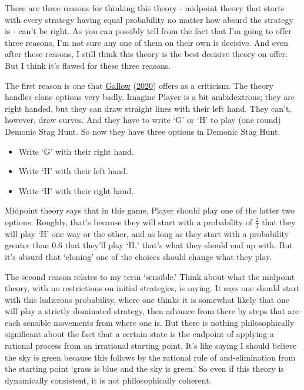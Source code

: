 \documentclass[
  12pt,
]{article}
\providecommand{\tightlist}{%
  \setlength{\itemsep}{0pt}\setlength{\parskip}{0pt}}
\begin{document}
There are three reasons for thinking this theory - midpoint theory that
starts with every strategy having equal probability no matter how absurd
the strategy is - can't be right. As you can possibly tell from the fact
that I'm going to offer three reasons, I'm not sure any one of them on
their own is decisive. And even after these reasons, I still think this
theory is the best decisive theory on offer. But I think it's flawed for
these three reasons.

The first reason is one that \protect\hyperlink{ref-Gallow2020}{Gallow}
(\protect\hyperlink{ref-Gallow2020}{2020}) offers as a criticism. The
theory handles clone options very badly. Imagine Player is a bit
ambidextrous; they are right handed, but they can draw straight lines
with their left hand. They can't, however, draw curves. And they have to
write `G' or `H' to play (one round) Demonic Stag Hunt. So now they have
three options in Demonic Stag Hunt.

\begin{itemize}
\tightlist
\item
  Write `G' with their right hand.
\item
  Write `H' with their left hand.
\item
  Write `H' with their right hand.
\end{itemize}

Midpoint theory says that in this game, Player should play one of the
latter two options. Roughly, that's because they will start with a
probability of \(\frac{2}{3}\) that they will play `H' one way or the
other, and as long as they start with a probability greater than 0.6
that they'll play `H,' that's what they should end up with. But it's
absurd that `cloning' one of the choices should change what they play.

The second reason relates to my term `sensible.' Think about what the
midpoint theory, with no restrictions on initial strategies, is saying.
It says one should start with this ludicrous probability, where one
thinks it is somewhat likely that one will play a strictly dominated
strategy, then advance from there by steps that are each sensible
movements from where one is. But there is nothing philosophically
significant about the fact that a certain state is the endpoint of
applying a rational process from an irrational starting point. It's like
saying I should believe the sky is green because this follows by the
rational rule of and-elimination from the starting point `grass is blue
and the sky is green.' So even if this theory is dynamically consistent,
it is not philosophically coherent.
\end{document}
